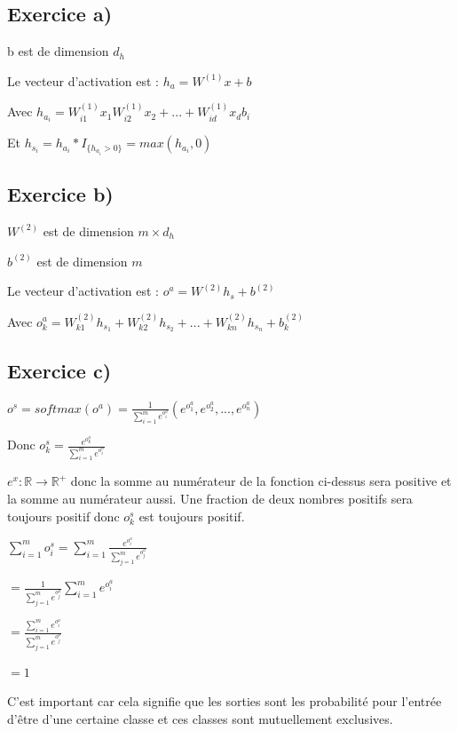 \documentclass[a4paper,10pt]{article}
\begin{document}
\subsection{Exercice a)}

b est de dimension $d_{h}$

Le vecteur d'activation est : $h_{a} = W^{(1)}x +b$

Avec $ h_{a_i} = W^{(1)}_{i1} x_{1}  W^{(1)}_{i2} x_{2} + ... + W^{(1)}_{id} x_{d} b_{i}$

Et $h_{s_i} = h_{a_i}*I_{ \{ h_{a_i} > 0 \} } = max(h_{a_i}, 0)$

\subsection{Exercice b)}

$W^{(2)}$ est de dimension $m \times d_{h}$

$b^{(2)}$ est de dimension $m$

Le vecteur d'activation est : $o^{a} = W^{(2)} h_{s} + b^{(2)}$

Avec $o^{a}_{k} = W^{(2)}_{k1} h_{s_1} + W^{(2)}_{k2} h_{s_2} + ... + W^{(2)}_{kn} h_{s_n} + b^{(2)}_{k}$

\subsection{Exercice c)}

$o^{s} = softmax(o^{a}) = \frac{1}{\sum_{i=1}^{m} e^{o^{a}_{i}}}  (e^{o^{a}_{1}}, e^{o^{a}_{2}}, ..., e^{o^{a}_{n}})$

Donc $o^{s}_{k} = \frac{e^{o^{a}_{k}}}{\sum_{i=1}^{m} e^{o^{a}_{i}}}$

$e^{x} : \mathds{R} \rightarrow \mathds{R}^{+}$ donc la somme au numérateur de la fonction ci-dessus sera positive et la somme au numérateur aussi. Une fraction de deux nombres positifs sera toujours positif donc $o^{s}_{k}$ est toujours positif.

$\sum^{m}_{i=1} o^{s}_{i} = \sum^{m}_{i=1} \frac{e^{o^{a}_{i}}}{\sum_{j=1}^{m} e^{o^{a}_{j}}}$

$ = \frac{1}{\sum_{j=1}^{m} e^{o^{a}_{j}}} \sum^{m}_{i=1} e^{o^{a}_{i}}$

$ = \frac{\sum^{m}_{i=1} e^{o^{a}_{i}}}{\sum_{j=1}^{m} e^{o^{a}_{j}}}$

$ =1 $


C'est important car cela signifie que les sorties sont les probabilité pour l'entrée d'être d'une certaine classe et ces classes sont mutuellement exclusives.
\end{document}
